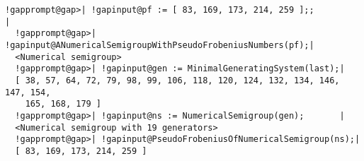 \documentclass[a4paper,11pt]{report}
\begin{document}
{{{ 
\begin{Verbatim}[commandchars=!@|,fontsize=\small,frame=single,label=Example]
  !gapprompt@gap>| !gapinput@pf := [ 83, 169, 173, 214, 259 ];;                     |
  !gapprompt@gap>| !gapinput@ANumericalSemigroupWithPseudoFrobeniusNumbers(pf);|
  <Numerical semigroup>
  !gapprompt@gap>| !gapinput@gen := MinimalGeneratingSystem(last);|
  [ 38, 57, 64, 72, 79, 98, 99, 106, 118, 120, 124, 132, 134, 146, 147, 154, 
    165, 168, 179 ]
  !gapprompt@gap>| !gapinput@ns := NumericalSemigroup(gen);       |
  <Numerical semigroup with 19 generators>
  !gapprompt@gap>| !gapinput@PseudoFrobeniusOfNumericalSemigroup(ns);|
  [ 83, 169, 173, 214, 259 ]
\end{Verbatim}
 }

 }

 }

 
\end{document}
